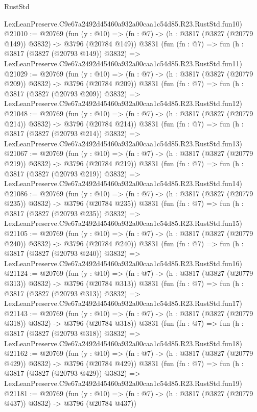 \begin{lexlean}{RustStd}
\begin{coremodule}
    LexLeanPreserve.C9e67a2492d45460a932a00caa1c54d85.R23.RustStd.fun10)
@21010 := @20769
    (fun (y : @10) => (fn : @7) -> (h : @3817 (@3827 (@20779 @149)) @3832) -> @3796 (@20784 @149))
    @3831
    (fun (fn : @7) =>
    fun (h : @3817 (@3827 (@20793 @149)) @3832) =>
    LexLeanPreserve.C9e67a2492d45460a932a00caa1c54d85.R23.RustStd.fun11)
@21029 := @20769
    (fun (y : @10) => (fn : @7) -> (h : @3817 (@3827 (@20779 @209)) @3832) -> @3796 (@20784 @209))
    @3831
    (fun (fn : @7) =>
    fun (h : @3817 (@3827 (@20793 @209)) @3832) =>
    LexLeanPreserve.C9e67a2492d45460a932a00caa1c54d85.R23.RustStd.fun12)
@21048 := @20769
    (fun (y : @10) => (fn : @7) -> (h : @3817 (@3827 (@20779 @214)) @3832) -> @3796 (@20784 @214))
    @3831
    (fun (fn : @7) =>
    fun (h : @3817 (@3827 (@20793 @214)) @3832) =>
    LexLeanPreserve.C9e67a2492d45460a932a00caa1c54d85.R23.RustStd.fun13)
@21067 := @20769
    (fun (y : @10) => (fn : @7) -> (h : @3817 (@3827 (@20779 @219)) @3832) -> @3796 (@20784 @219))
    @3831
    (fun (fn : @7) =>
    fun (h : @3817 (@3827 (@20793 @219)) @3832) =>
    LexLeanPreserve.C9e67a2492d45460a932a00caa1c54d85.R23.RustStd.fun14)
@21086 := @20769
    (fun (y : @10) => (fn : @7) -> (h : @3817 (@3827 (@20779 @235)) @3832) -> @3796 (@20784 @235))
    @3831
    (fun (fn : @7) =>
    fun (h : @3817 (@3827 (@20793 @235)) @3832) =>
    LexLeanPreserve.C9e67a2492d45460a932a00caa1c54d85.R23.RustStd.fun15)
@21105 := @20769
    (fun (y : @10) => (fn : @7) -> (h : @3817 (@3827 (@20779 @240)) @3832) -> @3796 (@20784 @240))
    @3831
    (fun (fn : @7) =>
    fun (h : @3817 (@3827 (@20793 @240)) @3832) =>
    LexLeanPreserve.C9e67a2492d45460a932a00caa1c54d85.R23.RustStd.fun16)
@21124 := @20769
    (fun (y : @10) => (fn : @7) -> (h : @3817 (@3827 (@20779 @313)) @3832) -> @3796 (@20784 @313))
    @3831
    (fun (fn : @7) =>
    fun (h : @3817 (@3827 (@20793 @313)) @3832) =>
    LexLeanPreserve.C9e67a2492d45460a932a00caa1c54d85.R23.RustStd.fun17)
@21143 := @20769
    (fun (y : @10) => (fn : @7) -> (h : @3817 (@3827 (@20779 @318)) @3832) -> @3796 (@20784 @318))
    @3831
    (fun (fn : @7) =>
    fun (h : @3817 (@3827 (@20793 @318)) @3832) =>
    LexLeanPreserve.C9e67a2492d45460a932a00caa1c54d85.R23.RustStd.fun18)
@21162 := @20769
    (fun (y : @10) => (fn : @7) -> (h : @3817 (@3827 (@20779 @429)) @3832) -> @3796 (@20784 @429))
    @3831
    (fun (fn : @7) =>
    fun (h : @3817 (@3827 (@20793 @429)) @3832) =>
    LexLeanPreserve.C9e67a2492d45460a932a00caa1c54d85.R23.RustStd.fun19)
@21181 := @20769
    (fun (y : @10) => (fn : @7) -> (h : @3817 (@3827 (@20779 @437)) @3832) -> @3796 (@20784 @437))

\end{coremodule}
\end{lexlean}
